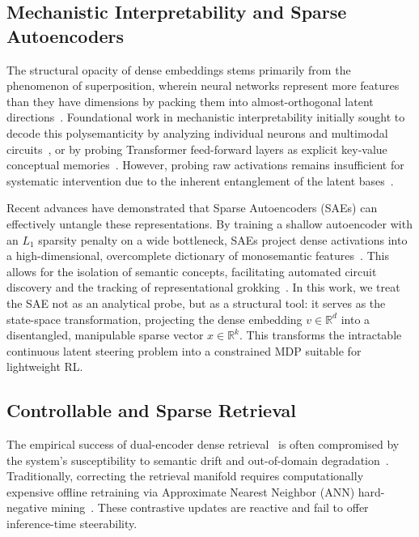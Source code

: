 \documentclass[sigconf]{acmart}
\begin{document}
\subsection{Mechanistic Interpretability and Sparse Autoencoders}

The structural opacity of dense embeddings stems primarily from the phenomenon of superposition, wherein neural networks represent more features than they have dimensions by packing them into almost-orthogonal latent directions~\cite{elhage2022}. Foundational work in mechanistic interpretability initially sought to decode this polysemanticity by analyzing individual neurons and multimodal circuits~\cite{olah2020, goh2021}, or by probing Transformer feed-forward layers as explicit key-value conceptual memories~\cite{yun2020, geva2022, meng2022}. However, probing raw activations remains insufficient for systematic intervention due to the inherent entanglement of the latent bases~\cite{lee2023, arora2018}.

Recent advances have demonstrated that Sparse Autoencoders (SAEs) can effectively untangle these representations. By training a shallow autoencoder with an $L_1$ sparsity penalty on a wide bottleneck, SAEs project dense activations into a high-dimensional, overcomplete dictionary of monosemantic features~\cite{cunningham2024, bricken2023, templeton2024, gao2024scaling}. This allows for the isolation of semantic concepts, facilitating automated circuit discovery and the tracking of representational grokking~\cite{conmy2023, nanda2023, wang2023}. In this work, we treat the SAE not as an analytical probe, but as a structural tool: it serves as the state-space transformation, projecting the dense embedding $v \in \mathbb{R}^d$ into a disentangled, manipulable sparse vector $x \in \mathbb{R}^k$. This transforms the intractable continuous latent steering problem into a constrained MDP suitable for lightweight RL.

\subsection{Controllable and Sparse Retrieval}

The empirical success of dual-encoder dense retrieval~\cite{karpukhin2020, izacard2022} is often compromised by the system's susceptibility to semantic drift and out-of-domain degradation~\cite{zhan2021}. Traditionally, correcting the retrieval manifold requires computationally expensive offline retraining via Approximate Nearest Neighbor (ANN) hard-negative mining~\cite{qu2021, hofstatter2021, xiong2021}. These contrastive updates are reactive and fail to offer inference-time steerability.
\end{document}
